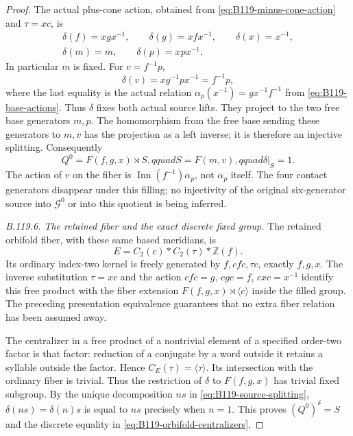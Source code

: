 \begin{proof}
The actual plus-cone action, obtained from
\eqref{eq:B119-minus-cone-action} and $\tau=xc$, is
\begin{equation}\label{eq:B119-plus-cone-action}
 \begin{gathered}
 \delta(f)=xgx^{-1},\qquad \delta(g)=xfx^{-1},\qquad
 \delta(x)=x^{-1},\\
 \delta(m)=m,\qquad \delta(p)=xpx^{-1}.
 \end{gathered}
\end{equation}
In particular $m$ is fixed. For $v=f^{-1}p$,
\[
 \delta(v)=xg^{-1}px^{-1}=f^{-1}p,
\]
where the last equality is the actual relation
$\alpha_p(x^{-1})=gx^{-1}f^{-1}$ from
\eqref{eq:B119-base-actions}. Thus $\delta$ fixes both actual
source lifts. They project to the two free base generators $m,p$.
The homomorphism from the free base sending these generators to
$m,v$ has the projection as a left inverse; it is therefore an
injective splitting. Consequently
\begin{equation}\label{eq:B119-source-splitting}
 Q^0=F(f,g,x)\rtimes S,qquad S=F(m,v),qquad
 \delta|_S=1.
\end{equation}
The action of $v$ on the fiber is
$\operatorname{Inn}(f^{-1})\alpha_p$, not $\alpha_p$ itself.
The four contact generators disappear under this filling; no
injectivity of the original six-generator source into
$\mathcal G^0$ or into this quotient is being inferred.

\emph{B.119.6. The retained fiber and the exact discrete fixed group.}
The retained orbifold fiber, with these same based meridians, is
\begin{equation}\label{eq:B119-orbifold-fiber}
 E=C_2(c)*C_2(\tau)*\mathbb Z(f).
\end{equation}
Its ordinary index-two kernel is freely generated by
$f,cfc,\tau c$, exactly $f,g,x$. The inverse substitution
$\tau=xc$ and the action
$cfc=g$, $cgc=f$, $cxc=x^{-1}$ identify this free product with
the fiber extension $F(f,g,x)\rtimes\langle c\rangle$ inside
the filled group. The preceding presentation equivalence guarantees
that no extra fiber relation has been assumed away.

The centralizer in a free product of a nontrivial element of a
specified order-two factor is that factor: reduction of a conjugate
by a word outside it retains a syllable outside the factor. Hence
$C_E(\tau)=\langle\tau\rangle$. Its intersection with the ordinary
fiber is trivial. Thus the restriction of $\delta$ to $F(f,g,x)$
has trivial fixed subgroup. By the unique decomposition
$ns$ in \eqref{eq:B119-source-splitting},
$\delta(ns)=\delta(n)s$ is equal to $ns$ precisely when $n=1$.
This proves $(Q^0)^\delta=S$ and the discrete equality in
\eqref{eq:B119-orbifold-centralizers}.


\end{proof}

